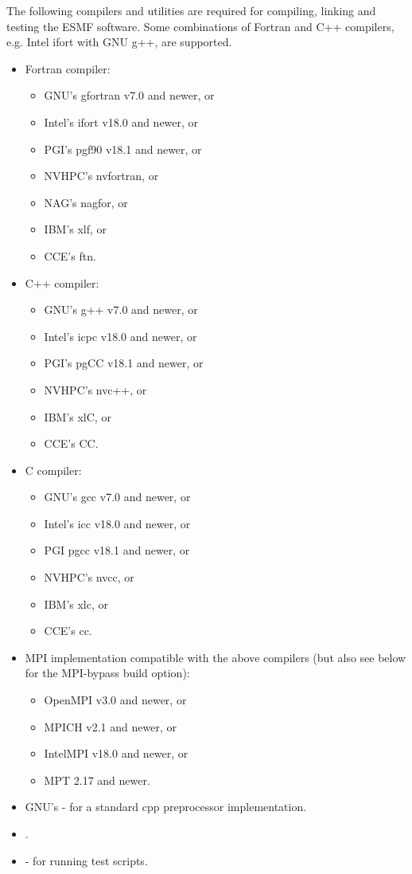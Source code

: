 

The following compilers and utilities are required for compiling, linking and
testing the ESMF software. Some combinations of Fortran and C++ compilers,
e.g. Intel ifort with GNU g++, are supported.
\begin{itemize}
\item Fortran compiler:
  \begin{itemize}
  \item GNU's gfortran v7.0 and newer, or
  \item Intel's ifort v18.0 and newer, or
  \item PGI's pgf90 v18.1 and newer, or
  \item NVHPC's nvfortran, or
  \item NAG's nagfor, or
  \item IBM's xlf, or
  \item CCE's ftn.
  \end{itemize}
\item C++ compiler:
  \begin{itemize}
  \item GNU's g++ v7.0 and newer, or
  \item Intel's icpc v18.0 and newer, or
  \item PGI's pgCC v18.1 and newer, or
  \item NVHPC's nvc++, or
  \item IBM's xlC, or
  \item CCE's CC.
  \end{itemize}
\item C compiler:
  \begin{itemize}
  \item GNU's gcc v7.0 and newer, or
  \item Intel's icc v18.0 and newer, or
  \item PGI pgcc v18.1 and newer, or
  \item NVHPC's nvcc, or
  \item IBM's xlc, or
  \item CCE's cc.
  \end{itemize}
\item MPI implementation compatible with the above compilers (but also see below
for the MPI-bypass build option):
  \begin{itemize}
  \item OpenMPI v3.0 and newer, or
  \item MPICH v2.1 and newer, or
  \item IntelMPI v18.0 and newer, or
  \item MPT 2.17 and newer.
  \end{itemize}
\item GNU's  -
for a standard cpp preprocessor implementation.
\item {}.
\item {} - for running
test scripts.
\end{itemize}

